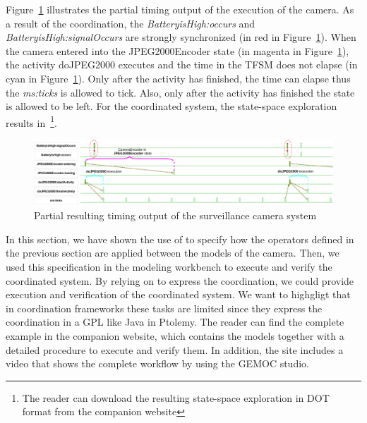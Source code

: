 Figure~\ref{fig:camerasystem} illustrates the partial timing output of the execution of the camera. As a result of the coordination, the \mse \emph{BatteryisHigh:occurs} and \emph{BatteryisHigh:signalOccurs} are strongly synchronized (in red in Figure~\ref{fig:camerasystem}). When the camera entered into the JPEG2000Encoder state (in magenta in Figure~\ref{fig:camerasystem}), the activity doJPEG2000 executes and the time in the TFSM does not elapse (in cyan in Figure~\ref{fig:camerasystem}). Only after the activity has finished, the time can elapse thus the \mse \emph{ms:ticks} is allowed to tick. Also, only after the activity has finished the state is allowed to be left. For the coordinated system, the state-space exploration results in~\footnote{The reader can download the resulting state-space exploration in DOT format from the companion website}.
	
		\begin{figure}[h]
			\center
			\includegraphics[width=1\columnwidth]{examples/figs/vcdcamera}
			\caption{Partial resulting timing output of the surveillance camera system}
			\label{fig:camerasystem}
		\end{figure}
	
In this section, we have shown the use of \bflow to specify how the operators defined in the previous section are applied between the models of the camera. Then, we used this specification in the modeling workbench to execute and verify the coordinated system. By relying on \ccsl to express the coordination, we could provide execution and verification of the coordinated system. We want to highgligt that in coordination frameworks these tasks are limited since they express the coordination in a GPL like Java in Ptolemy. The reader can find the complete example in the companion website, which contains the models together with a detailed procedure to execute and verify them. In addition, the site includes a video that shows the complete workflow by using the GEMOC studio.



